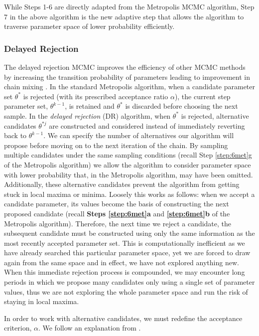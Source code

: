 \par While Steps 1-6 are directly adapted from the Metropolis MCMC algorithm, Step 7 in the above algorithm is the new adaptive step that allows the algorithm to traverse parameter space of lower probability efficiently.

\subsubsection{Delayed Rejection}
\par The delayed rejection MCMC improves the efficiency of other MCMC methods by increasing the transition probability of parameters leading to improvement in chain mixing \cite{trias2009delayed}. In the standard Metropolis algorithm, when a candidate parameter set $\theta^*$ is rejected (with its prescribed acceptance ratio $\alpha$), the current step parameter set, $\theta^{k-1}$, is retained and $\theta^*$ is discarded before choosing the next sample. In the \emph{delayed rejection} (DR) algorithm, when $\theta^*$ is rejected, alternative candidates $\theta^{*j}$ are constructed and considered instead of immediately reverting back to $\theta^{k-1}$. We can specify the number of alternatives our algorithm will propose before moving on to the next iteration of the chain. By sampling multiple candidates under the same sampling conditions (recall Step \ref{step:6met}g of the Metropolis algorithm) we allow the algorithm to consider parameter space with lower probability that, in the Metropolis algorithm, may have been omitted. Additionally, these alternative candidates prevent the algorithm from getting stuck in local maxima or minima. Loosely this works as follows: when we accept a candidate parameter, its values become the basis of constructing the next proposed candidate (recall \textbf{Steps \ref{step:6met}a} and \textbf{\ref{step:6met}b} of the Metropolis algorithm). Therefore, the next time we reject a candidate, the subsequent candidate must be constructed using only the same information as the most recently accepted parameter set. This is computationally inefficient as we have already searched this particular parameter space, yet we are forced to draw again from the same space and in effect, we have not explored anything new. When this immediate rejection process is compounded, we may encounter long periods in which we propose many candidates only using a single set of parameter values, thus we are not exploring the whole parameter space and run the risk of staying in local maxima.
\par In order to work with alternative candidates, we must redefine the acceptance criterion, $\alpha$. We follow an explanation from \cite{smithCh8}.\\
